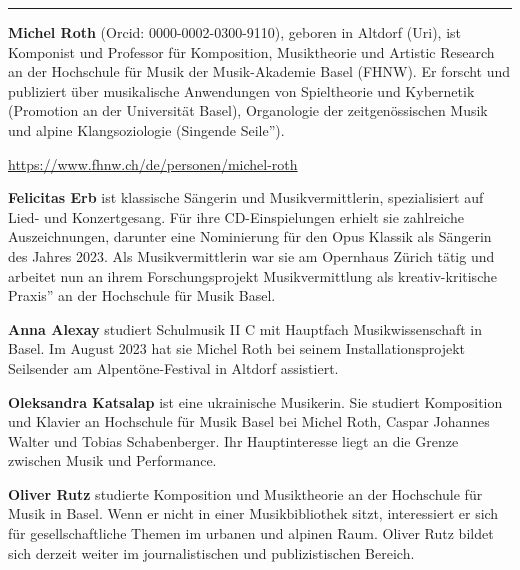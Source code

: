 \begin{center}\rule{0.5\linewidth}{0.5pt}\end{center}

\textbf{Michel Roth} (Orcid: 0000-0002-0300-9110), geboren in Altdorf
(Uri), ist Komponist und Professor für Komposition, Musiktheorie und
Artistic Research an der Hochschule für Musik der Musik-Akademie Basel
(FHNW). Er forscht und publiziert über musikalische Anwendungen von
Spieltheorie und Kybernetik (Promotion an der Universität Basel),
Organologie der zeitgenössischen Musik und alpine Klangsoziologie
(Singende Seile'').

\url{https://www.fhnw.ch/de/personen/michel-roth}

\textbf{Felicitas Erb} ist klassische Sängerin und Musikvermittlerin,
spezialisiert auf Lied- und Konzertgesang. Für ihre CD-Einspielungen
erhielt sie zahlreiche Auszeichnungen, darunter eine Nominierung für den
Opus Klassik als Sängerin des Jahres 2023. Als Musikvermittlerin war sie
am Opernhaus Zürich tätig und arbeitet nun an ihrem Forschungsprojekt
Musikvermittlung als kreativ-kritische Praxis'' an der Hochschule für
Musik Basel.

\textbf{Anna Alexay} studiert Schulmusik II C mit Hauptfach
Musikwissenschaft in Basel. Im August 2023 hat sie Michel Roth bei
seinem Installationsprojekt Seilsender am Alpentöne-Festival in Altdorf
assistiert.

\textbf{Oleksandra Katsalap} ist eine ukrainische Musikerin. Sie
studiert Komposition und Klavier an Hochschule für Musik Basel bei
Michel Roth, Caspar Johannes Walter und Tobias Schabenberger. Ihr
Hauptinteresse liegt an die Grenze zwischen Musik und Performance.

\textbf{Oliver Rutz} studierte Komposition und Musiktheorie an der
Hochschule für Musik in Basel. Wenn er nicht in einer Musikbibliothek
sitzt, interessiert er sich für gesellschaftliche Themen im urbanen und
alpinen Raum. Oliver Rutz bildet sich derzeit weiter im journalistischen
und publizistischen Bereich.
